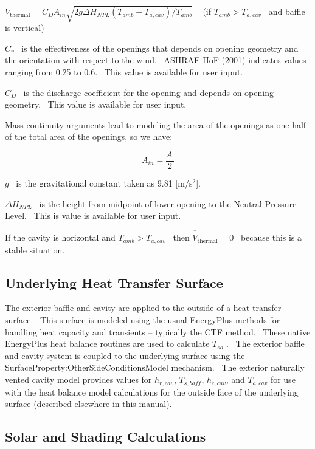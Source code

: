 \({{\overline{\dot V}}_{{\mathrm{thermal}}}} = {C_D}{A_{in}}\sqrt {2g\Delta {H_{NPL}}\left( {{T_{amb}} - {T_{a,cav}}} \right)/{T_{amb}}}\) ~ (if \(T_{amb} > T_{a,cav}\) ~and baffle is vertical)

\({C_v}\) ~is the effectiveness of the openings that depends on opening geometry and the orientation with respect to the wind.~ ASHRAE HoF (2001) indicates values ranging from 0.25 to 0.6.~ This value is available for user input.

\({C_D}\) ~is the discharge coefficient for the opening and depends on opening geometry.~ This value is available for user input.

Mass continuity arguments lead to modeling the area of the openings as one half of the total area of the openings, so we have:

\begin{equation}
{A_{in}} = \frac{{A\,}}{2}
\end{equation}

\(g\) ~is the gravitational constant taken as 9.81 {[}m/s\(^{2}\){]}.

\(\Delta {H_{NPL}}\) ~is the height from midpoint of lower opening to the Neutral Pressure Level.~ This is value is available for user input.

If the cavity is horizontal and \(T_{amb} > T_{a,cav}\) ~then \({{\overline{\dot V}}_{{\mathrm{thermal}}}}{\mathrm{ = 0}}\) ~because this is a stable situation.

\subsection{Underlying Heat Transfer Surface}\label{underlying-heat-transfer-surface}

The exterior baffle and cavity are applied to the outside of a heat transfer surface.~ This surface is modeled using the usual EnergyPlus methods for handling heat capacity and transients -- typically the CTF method.~ These native EnergyPlus heat balance routines are used to calculate \({T_{so}}\) .~ The exterior baffle and cavity system is coupled to the underlying surface using the SurfaceProperty:OtherSideConditionsModel mechanism.~ The exterior naturally vented cavity model provides values for \({h_{r,cav}}\), \({T_{s,baff}}\), \({h_{c,cav}}\), and \({T_{a,cav}}\) for use with the heat balance model calculations for the outside face of the underlying surface (described elsewhere in this manual).

\subsection{Solar and Shading Calculations}\label{solar-and-shading-calculations}

